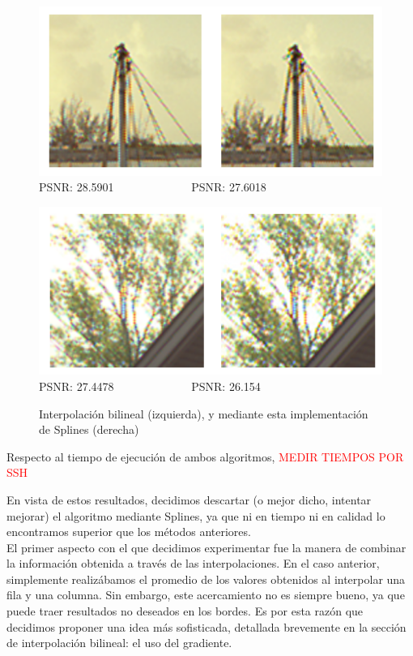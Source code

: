 \documentclass[a4paper]{article}
\begin{document}
\begin{figure}[h!]
	\begin{center}
	    \includegraphics[scale=0.47]{imagenes/Splines/RecortesSplines/promedio/barcos.png}\\
	    PSNR: 28.5901 \ \ \ \ \ \ \ \ \ \ \ \ \ PSNR: 27.6018
	\end{center}
	\begin{center}
	    \includegraphics[scale=0.47]{imagenes/Splines/RecortesSplines/promedio/arbol.png}\\
	    PSNR: 27.4478 \ \ \ \ \ \ \ \ \ \ \ \ \ PSNR: 26.154
	\end{center}
	\caption{Interpolación bilineal (izquierda), y mediante esta implementación de Splines (derecha)}
	\label{splines2}
\end{figure}

Respecto al tiempo de ejecución de ambos algoritmos, \textcolor{red}{MEDIR TIEMPOS POR SSH\\}

En vista de estos resultados, decidimos descartar (o mejor dicho, intentar mejorar) el algoritmo mediante Splines, ya que ni en tiempo ni en calidad lo encontramos superior que los métodos anteriores.\\

El primer aspecto con el que decidimos experimentar fue la manera de combinar la información obtenida a través de las interpolaciones. En el caso anterior, simplemente realizábamos el promedio de los valores obtenidos al interpolar una fila y una columna. Sin embargo, este acercamiento no es siempre bueno, ya que puede traer resultados no deseados en los bordes. Es por esta razón que decidimos proponer una idea más sofisticada, detallada brevemente en la sección de interpolación bilineal: el uso del gradiente. \\
\end{document}
